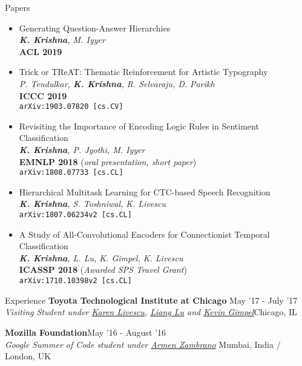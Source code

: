 \documentclass{resume} %
\begin{document}
\begin{rSection}{Papers}
\begin{itemize}[leftmargin=*]
\item Generating Question-Answer Hierarchies \\ \textit{\textbf{K. Krishna}, M. Iyyer} \\ \textbf{ACL 2019} 
\item Trick or TReAT: Thematic Reinforcement for Artistic Typography \\ \textit{P. Tendulkar, \textbf{K. Krishna}, R. Selvaraju, D. Parikh} \\ \textbf{ICCC 2019} \\ \texttt{arXiv:1903.07820 [cs.CV]} 
\item Revisiting the Importance of Encoding Logic Rules in Sentiment Classification \\ \textit{\textbf{K. Krishna}, P. Jyothi, M. Iyyer} \\ \textbf{EMNLP 2018} (\textit{oral presentation, short paper}) \\
\texttt{arXiv:1808.07733 [cs.CL]}
\item Hierarchical Multitask Learning for CTC-based Speech Recognition  \\ \textit{\textbf{K. Krishna}, S. Toshniwal, K. Livescu} \\ \texttt{arXiv:1807.06234v2 [cs.CL]} 
\item A Study of All-Convolutional Encoders for Connectionist Temporal Classification\\ \textit{\textbf{K. Krishna}, L. Lu, K. Gimpel,  K. Livescu}\\ \textbf{ICASSP 2018} (\textit{Awarded SPS Travel Grant}) \\ \texttt{arXiv:1710.10398v2 [cs.CL]} 
\end{itemize}
\end{rSection}
\vspace*{-1.5mm}
\begin{rSection}{Experience}
{\bf Toyota Technological Institute at Chicago}{ \hfill May '17 - July '17}\\ \textit{Visiting Student under \href{http://ttic.uchicago.edu/~klivescu/}{Karen Livescu}, \href{http://ttic.uchicago.edu/~llu/}{Liang Lu} and \href{http://ttic.uchicago.edu/~kgimpel/}{Kevin Gimpel}}{\hfill Chicago, IL}

{\bf Mozilla Foundation}{\hfill May '16 - August '16} \\ \textit{Google Summer of Code student under \href{https://github.com/armenzg}{Armen Zambrano}}{ \hfill Mumbai, India / London, UK}
\end{rSection}
\end{document}
